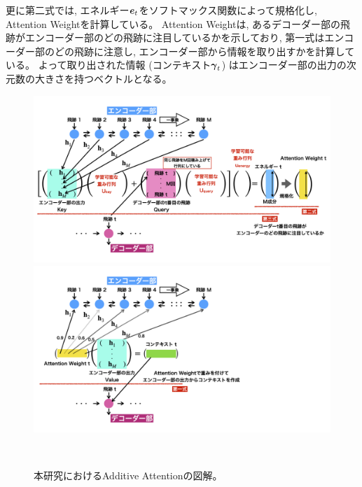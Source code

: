 更に第二式では, エネルギー${\mbox{\boldmath{$e$}}}_{t}$をソフトマックス関数によって規格化し, Attention Weightを計算している。
Attention Weightは, あるデコーダー部の飛跡がエンコーダー部のどの飛跡に注目しているかを示しており, 第一式はエンコーダー部のどの飛跡に注意し, エンコーダー部から情報を取り出すかを計算している。
よって取り出された情報 (コンテキスト${\mbox{\boldmath{$\gamma$}}}_{t}$) はエンコーダー部の出力の次元数の大きさを持つベクトルとなる。

\begin{figure}[htbp]
 \centering
   \begin{minipage}{1.0\textwidth}
    \centering
    \includegraphics[width=1.0\textwidth, clip]{Figure/3Networks/3-4-1-6Attention.png}
   \end{minipage}
   
   \begin{minipage}{1.0\textwidth}
   \centering
    \includegraphics[width=1.0\textwidth, clip]{Figure/3Networks/3-4-1-7Attention.png}
   \end{minipage}
  \caption[本研究におけるAdditive Attentionの図解]{本研究におけるAdditive Attentionの図解。}
  \label{3-4-1-6Attention}
\end{figure}

